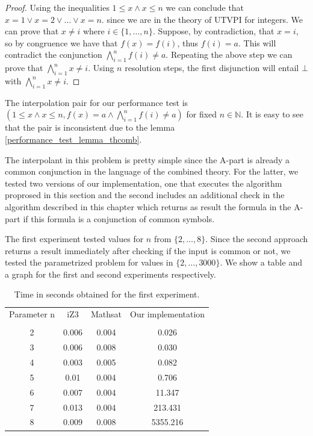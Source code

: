 \begin{proof}
  Using the inequalities $1 \leq x \land x \leq n$
  we can conclude that $x = 1 \lor x = 2 \lor \dots \lor x = n$.
  since we are in the theory of UTVPI for integers.
  We can prove that $x \neq i$ where $i \in \{1, \dots, n \}$.
  Suppose, by contradiction, that $x = i$, so by congruence
  we have that $f(x) = f(i)$, thus $f(i) = a$. This will 
  contradict the conjunction $\bigwedge_{i=1}^{n} f(i) \neq a$.
  Repeating the above step we can prove that 
  $\bigwedge_{i=1}^n x \neq i$. Using $n$ resolution steps, 
  the first disjunction will entail $\bot$ with 
  $\bigwedge_{i=1}^{n} x \neq i$.
\end{proof}

The interpolation pair for our performance test 
is $(1 \leq x \land x \leq n, 
f(x) = a \land \bigwedge_{i=1}^{n} f(i) \neq a)$
for fixed $n \in \mathbb{N}$.
It is easy to see that the pair is inconsistent due to the lemma 
\ref{performance_test_lemma_thcomb}. 

The interpolant in this problem is pretty simple since the 
A-part is already a common conjunction in the language of the
combined theory. For the latter, we tested two versions of our
implementation, one that executes the algorithm proprosed in
this section and the second includes an additional check in 
the algorithm described in this chapter which returns as result
the formula in the A-part if this formula is a conjunction of 
common symbols.

The first experiment tested values for $n$ from $\{2, \dots, 8\}$.
Since the second approach returns a result immediately after
checking if the input is common or not, we tested the parametrized
problem for values in $\{2, \dots, 3000\}$. We show a table and a
graph for the first and second experiments respectively.

\begin{table}[h]
  \centering
  \begin{tabular}{cccc}
    \toprule
    Parameter n        & iZ3 & Mathsat & Our implementation \\
    \cmidrule{2-4}                                          \\
    2 & 0.006 & 0.004 & 0.026    \\
    3 & 0.006 & 0.008 & 0.030    \\
    4 & 0.003 & 0.005 & 0.082    \\
    5 & 0.01  & 0.004 & 0.706    \\
    6 & 0.007 & 0.004 & 11.347   \\
    7 & 0.013 & 0.004 & 213.431  \\
    8 & 0.009 & 0.008 & 5355.216 \\
    \bottomrule
  \end{tabular}
  \caption{Time in seconds obtained for the first experiment.}
\end{table}

